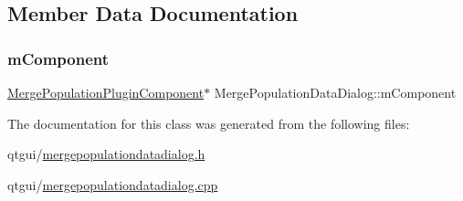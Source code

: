 \subsection{Member Data Documentation}
\mbox{\label{class_merge_population_data_dialog_a05afea9f8c00e28df7c8ac27496b03ff}} 
\subsubsection{\texorpdfstring{mComponent}{mComponent}}
{\footnotesize\ttfamily \mbox{\hyperlink{class_merge_population_plugin_component}{Merge\+Population\+Plugin\+Component}}$\ast$ Merge\+Population\+Data\+Dialog\+::m\+Component\hspace{0.3cm}{\ttfamily [protected]}}



The documentation for this class was generated from the following files\+:\begin{DoxyCompactItemize}
\item 
qtgui/\mbox{\hyperlink{mergepopulationdatadialog_8h}{mergepopulationdatadialog.\+h}}\item 
qtgui/\mbox{\hyperlink{mergepopulationdatadialog_8cpp}{mergepopulationdatadialog.\+cpp}}\end{DoxyCompactItemize}
